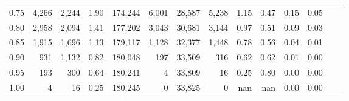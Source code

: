 \begin{tabular}{rrrrrrrrrrrrrr}
0.75 &   4,266 &  2,244 &    1.90 &  174,244 &    6,001 &  28,587 &   5,238 &  1.15 &  0.47 &  0.15 &      0.05 \\
0.80 &   2,958 &  2,094 &    1.41 &  177,202 &    3,043 &  30,681 &   3,144 &  0.97 &  0.51 &  0.09 &      0.03 \\
0.85 &   1,915 &  1,696 &    1.13 &  179,117 &    1,128 &  32,377 &   1,448 &  0.78 &  0.56 &  0.04 &      0.01 \\
0.90 &     931 &  1,132 &    0.82 &  180,048 &      197 &  33,509 &     316 &  0.62 &  0.62 &  0.01 &      0.00 \\
0.95 &     193 &    300 &    0.64 &  180,241 &        4 &  33,809 &      16 &  0.25 &  0.80 &  0.00 &      0.00 \\
1.00 &       4 &     16 &    0.25 &  180,245 &        0 &  33,825 &       0 &   nan &   nan &  0.00 &      0.00 \\
\bottomrule
\end{tabular}
